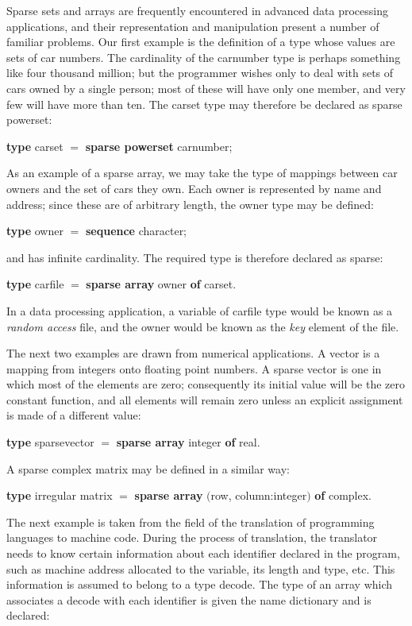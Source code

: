 Sparse sets and arrays are frequently encountered in advanced data processing applications, and their representation and manipulation present a number of familiar problems. Our first example is the definition of a type whose values are sets of car numbers. The cardinality of the carnumber type is perhaps something like four thousand million; but the programmer wishes only to deal with sets of cars owned by a single person; most of these will have only one member, and very few will have more than ten. The carset type may therefore be declared as sparse powerset:

\quad \textbf{type} carset $=$ \textbf{sparse powerset} carnumber;

As an example of a sparse array, we may take the type of mappings between car owners and the set of cars they own. Each owner is represented by name and address; since these are of arbitrary length, the owner type may be defined:

\quad \textbf{type} owner $=$ \textbf{sequence} character;

\noindent
and has infinite cardinality. The required type is therefore declared as sparse:

\quad \textbf{type} carfile $=$ \textbf{sparse array} owner \textbf{of} carset.

In a data processing application, a variable of carfile type would be known as a \textit{random access} file, and the owner would be known as the \textit{key} element of the file.

The next two examples are drawn from numerical applications. A vector is a mapping from integers onto floating point numbers. A sparse vector is one in which most of the elements are zero; consequently its initial value will be the zero constant function, and all elements will remain zero unless an explicit assignment is made of a different value:

\quad \textbf{type} sparsevector $=$ \textbf{sparse array} integer \textbf{of} real.

\noindent
A sparse complex matrix may be defined in a similar way:

\quad \textbf{type} irregular matrix $=$ \textbf{sparse array} $($row, column:integer$)$ \textbf{of} complex.

The next example is taken from the field of the translation of programming languages to machine code. During the process of translation, the translator needs to know certain information about each identifier declared in the program, such as machine address allocated to the variable, its length and type, etc. This information is assumed to belong to a type decode. The type of an array which associates a decode with each identifier is given the name dictionary and is declared:

